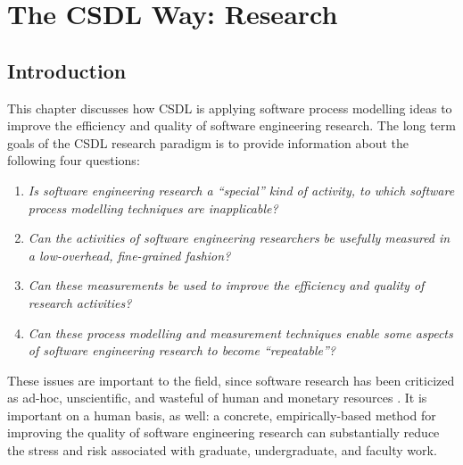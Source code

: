 
\chapter{The CSDL Way: Research}


\section{Introduction}
\label{sec:motivation}

This chapter discusses how CSDL is applying software process modelling
ideas to improve the efficiency and quality of software engineering
research.  The long term goals of the CSDL research paradigm is to 
provide information about the following four questions:

\begin{enumerate}
\item {\em Is  software engineering research a ``special'' kind of
  activity, to which software process modelling techniques are inapplicable?}

\item {\em Can the activities of software engineering researchers be 
usefully measured in a low-overhead, fine-grained fashion?}

\item {\em Can these measurements be used to improve the efficiency and 
quality of research activities?}

\item {\em Can these process modelling and measurement techniques enable
  some aspects of software engineering research to become ``repeatable''?}
\end{enumerate}

These issues are important to the field, since software research has been
criticized as ad-hoc, unscientific, and wasteful of human and monetary
resources \cite{Berry92,Tichy93,Cohen88}. It is important on a human basis,
as well: a concrete, empirically-based method for improving the quality of
software engineering research can substantially reduce the stress and risk
associated with graduate, undergraduate, and faculty work.

